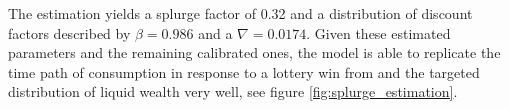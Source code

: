 \documentclass[../HAFiscal]{subfiles}
\begin{document}
The estimation yields a splurge factor of 0.32 and a distribution of discount factors described by $\beta = 0.986$ and a $\nabla=0.0174$. Given these estimated parameters and the remaining calibrated ones, the model is able to replicate the time path of consumption in response to a lottery win from \citet{fagereng_mpc_2021} and the targeted distribution of liquid wealth very well, see figure \ref{fig:splurge_estimation}.
\end{document}
